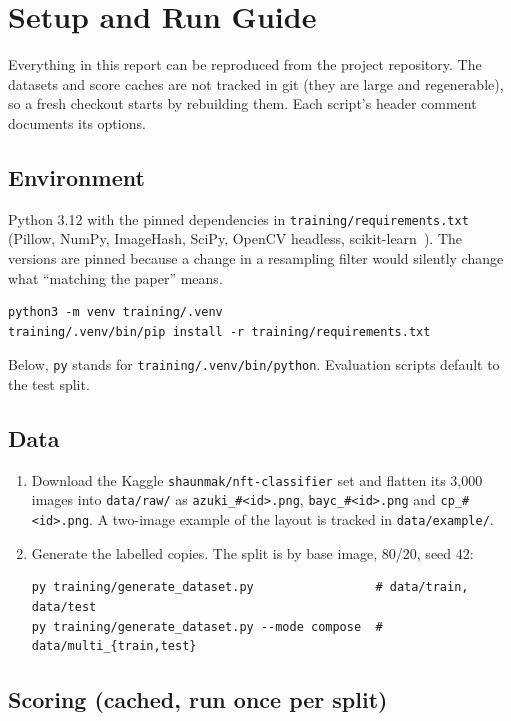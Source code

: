 \section{Setup and Run Guide}
\label{app:setup}

Everything in this report can be reproduced from the project repository. The datasets and
score caches are not tracked in git (they are large and regenerable), so a fresh checkout
starts by rebuilding them. Each script's header comment documents its options.

\subsection{Environment}

Python 3.12 with the pinned dependencies in \texttt{training/requirements.txt} (Pillow,
NumPy, ImageHash, SciPy, OpenCV headless, scikit-learn~\cite{opencv,sklearn}). The versions are
pinned because a change in a resampling filter would silently change what ``matching the
paper'' means.
\begin{lstlisting}
python3 -m venv training/.venv
training/.venv/bin/pip install -r training/requirements.txt
\end{lstlisting}
Below, \texttt{py} stands for \texttt{training/.venv/bin/python}. Evaluation scripts default
to the test split.

\subsection{Data}

\begin{enumerate}
  \item Download the Kaggle \texttt{shaunmak/nft-classifier} set and flatten its 3,000 images
        into \texttt{data/raw/} as \texttt{azuki\_\#<id>.png}, \texttt{bayc\_\#<id>.png} and
        \texttt{cp\_\#<id>.png}. A two-image example of the layout is tracked in
        \texttt{data/example/}.
  \item Generate the labelled copies. The split is by base image, 80/20, seed 42:
\begin{lstlisting}
py training/generate_dataset.py                 # data/train, data/test
py training/generate_dataset.py --mode compose  # data/multi_{train,test}
\end{lstlisting}
\end{enumerate}

\subsection{Scoring (cached, run once per split)}

